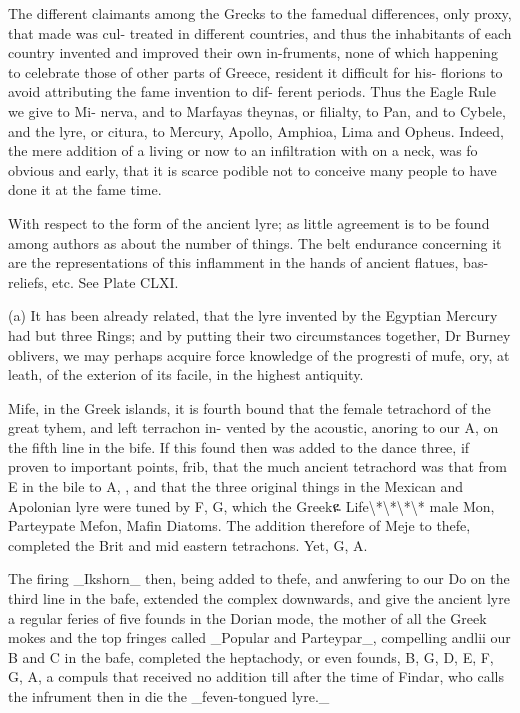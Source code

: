 \documentclass{article}
\begin{document}
The different claimants among the Grecks to the famedual differences, only proxy, that made was cul- treated in different countries, and thus the inhabitants of each country invented and improved their own in-fruments, none of which happening to celebrate those of other parts of Greece, resident it difficult for his- florions to avoid attributing the fame invention to dif- ferent periods. Thus the Eagle Rule we give to Mi- nerva, and to Marfayas theynas, or filialty, to Pan, and to Cybele, and the lyre, or citura, to Mercury, Apollo, Amphioa, Lima and Opheus. Indeed, the mere addition of a living or now to an infiltration with on a neck, was fo obvious and early, that it is scarce podible not to conceive many people to have done it at the fame time.

With respect to the form of the ancient lyre; as little agreement is to be found among authors as about the number of things. The belt endurance concerning it are the representations of this inflamment in the hands of ancient flatues, bas-reliefs, etc. See Plate CLXI.

(a) It has been already related, that the lyre invented by the Egyptian Mercury had but three Rings; and by putting their two circumstances together, Dr Burney oblivers, we may perhaps acquire force knowledge of the progresti of mufe, ory, at leath, of the exterion of its facile, in the highest antiquity.

Mife, in the Greek islands, it is fourth bound that the female tetrachord of the great tyhem, and left terrachon in- vented by the acoustic, anoring to our A, on the fifth line in the bife. If this found then was added to the dance three, if proven to important points, frib, that the much ancient tetrachord was that from E in the bile to A, , and that the three original things in the Mexican and Apolonian lyre were tuned by F, G, which the Greekዬ Life\textbackslash{}*\textbackslash{}*\textbackslash{}*\textbackslash{}* male Mon, Parteypate Mefon, Mafin Diatoms. The addition therefore of Meje to thefe, completed the Brit and mid eastern tetrachons. Yet, G, A.

The firing \_Ikshorn\_ then, being added to thefe, and anwfering to our Do on the third line in the bafe, extended the complex downwards, and give the ancient lyre a regular feries of five founds in the Dorian mode, the mother of all the Greek mokes and the top fringes called \_Popular and Parteypar\_, compelling andlii our B and C in the bafe, completed the heptachody, or even founds, B, G, D, E, F, G, A, a compuls that received no addition till after the time of Findar, who calls the infrument then in die the \_feven-tongued lyre.\_
\end{document}
